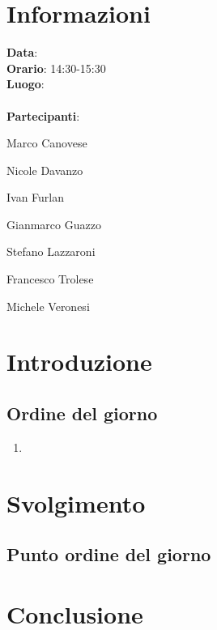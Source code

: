 \section{Informazioni}
\textbf{Data}:\\
\textbf{Orario}: 14:30-15:30\\
\textbf{Luogo}:\\\\
\textbf{Partecipanti}:\begin{list}{*}{\setlength{\itemsep}{0cm}}
	\item Marco Canovese
	\item Nicole Davanzo
	\item Ivan Furlan
	\item Gianmarco Guazzo
	\item Stefano Lazzaroni
	\item Francesco Trolese
	\item Michele Veronesi
\end{list}
\section{Introduzione}
\subsection{Ordine del giorno}
\begin{enumerate}
    \item %
\end{enumerate}

\section{Svolgimento}
\subsection{Punto ordine del giorno} %

\section{Conclusione}

